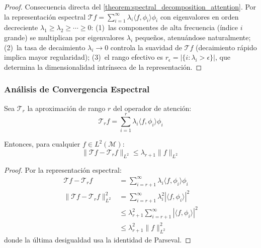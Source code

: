 \begin{proof}
Consecuencia directa del \autoref{theorem:spectral_decomposition_attention}. Por la representación espectral $\mathcal{T}f = \sum_{i=1}^\infty \lambda_i \langle f, \phi_i \rangle \phi_i$ con eigenvalores en orden decreciente $\lambda_1 \geq \lambda_2 \geq \cdots \geq 0$: (1)~las componentes de alta frecuencia (índice $i$ grande) se multiplican por eigenvalores $\lambda_i$ pequeños, atenuándose naturalmente; (2)~la tasa de decaimiento $\lambda_i \to 0$ controla la suavidad de $\mathcal{T}f$ (decaimiento rápido implica mayor regularidad); (3)~el rango efectivo es $r_\epsilon = |\{i : \lambda_i > \epsilon\}|$, que determina la dimensionalidad intrínseca de la representación.
\end{proof}

\subsubsection{Análisis de Convergencia Espectral}

\begin{theorem}\label{theorem:finite_rank_convergence}
    Sea $\mathcal{T}_r$ la aproximación de rango $r$ del operador de atención:
    \begin{equation}
        \mathcal{T}_r f = \sum_{i=1}^{r} \lambda_i \langle f, \phi_i \rangle \phi_i
        \label{eq:finite_rank_approximation}
    \end{equation}
    
    Entonces, para cualquier $f \in L^2(\mathcal{M})$:
    \begin{equation}
        \|\mathcal{T}f - \mathcal{T}_r f\|_{L^2} \leq \lambda_{r+1} \|f\|_{L^2}
        \label{eq:approximation_error_bound}
    \end{equation}
\end{theorem}

\begin{proof}
    Por la representación espectral:
    \begin{align}
        \mathcal{T}f - \mathcal{T}_r f &= \sum_{i=r+1}^{\infty} \lambda_i \langle f, \phi_i \rangle \phi_i \\
        \|\mathcal{T}f - \mathcal{T}_r f\|_{L^2}^2 &= \sum_{i=r+1}^{\infty} \lambda_i^2 |\langle f, \phi_i \rangle|^2 \\
        &\leq \lambda_{r+1}^2 \sum_{i=r+1}^{\infty} |\langle f, \phi_i \rangle|^2 \\
        &\leq \lambda_{r+1}^2 \|f\|_{L^2}^2
    \end{align}
    donde la última desigualdad usa la identidad de Parseval.
\end{proof}


